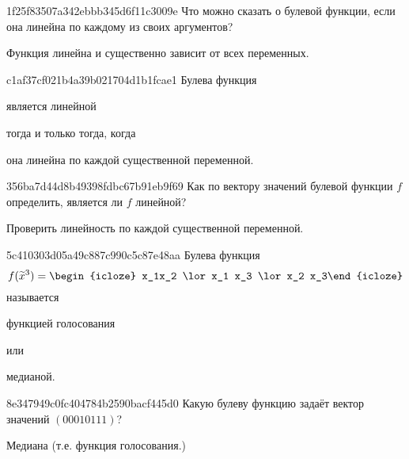 \begin{note}{1f25f83507a342ebbb345d6f11c3009e}
    Что можно сказать о булевой функции, если она линейна по каждому из своих аргументов?

    \begin{cloze}{1}
        Функция линейна и существенно зависит от всех переменных.
    \end{cloze}
\end{note}

\begin{note}{c1af37cf021b4a39b021704d1b1fcae1}
    Булева функция \begin{icloze}{2}является линейной\end{icloze} \begin{icloze}{3}тогда и только тогда, когда\end{icloze} \begin{icloze}{1}она линейна по каждой существенной переменной.\end{icloze}
\end{note}

\begin{note}{356ba7d44d8b49398fdbc67b91eb9f69}
    Как по вектору значений булевой функции \({ f }\) определить, является ли \({ f }\) линейной?

    \begin{cloze}{1}
        Проверить линейность по каждой существенной переменной.
    \end{cloze}
\end{note}

\begin{note}{5c410303d05a49c887c990c5c87e48aa}
    Булева функция
    \[
        f(\widetilde x^{3}) = \begin{icloze}{2}x_1x_2 \lor x_1 x_3 \lor x_2 x_3\end{icloze}
    \]
    называется \begin{icloze}{1}функцией голосования\end{icloze} или \begin{icloze}{1}медианой.\end{icloze}
\end{note}

\begin{note}{8e347949c0fc404784b2590bacf445d0}
    Какую булеву функцию задаёт вектор значений \({ (00010111) }\)?

    \begin{cloze}{1}
        Медиана (т.е. функция голосования.)
    \end{cloze}
\end{note}


